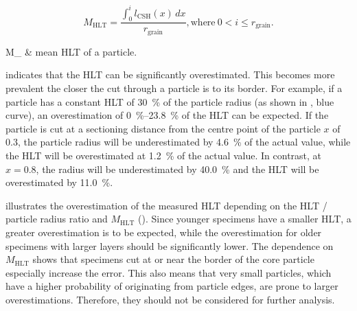 \begin{equation}
	M_\text{HLT} = \frac{\int_{0}^{i} l_{\mathrm{CSH}}(x) \,dx}{r_\text{grain}}, \text{where}~0 < i \leq r_\text{grain}.
	\label{eq:sectioning_effect_3}
\end{equation}
\begin{conditions}
	M_		&	mean \ac{HLT} of a particle. \\
\end{conditions}

 indicates that the \ac{HLT} can be significantly overestimated.
This becomes more prevalent the closer the cut through a particle is to its border.
For example, if a particle has a constant \ac{HLT} of \qty{30}{\percent} of the particle radius (as shown in , blue curve), an overestimation of \qtyrange{0}{23.8}{\percent} of the \ac{HLT} can be expected.
If the particle is cut at a sectioning distance from the centre point of the particle $x$ of \num{0.3}, the particle radius will be underestimated by \qty{4.6}{\percent} of the actual value, while the \ac{HLT} will be overestimated at \qty{1.2}{\percent} of the actual value.
In contrast, at $x=0.8$, the radius will be underestimated by \qty{40.0}{\percent} and the \ac{HLT} will be overestimated by \qty{11.0}{\percent}.

 illustrates the overestimation of the measured \ac{HLT} depending on the \ac{HLT} / particle radius ratio and $M_\text{HLT}$ ().
Since younger specimens have a smaller \ac{HLT}, a greater overestimation is to be expected, while the overestimation for older specimens with larger layers should be significantly lower.
The dependence on $M_\text{HLT}$ shows that specimens cut at or near the border of the core particle especially increase the error.
This also means that very small particles, which have a higher probability of originating from particle edges, are prone to larger overestimations.
Therefore, they should not be considered for further analysis.

